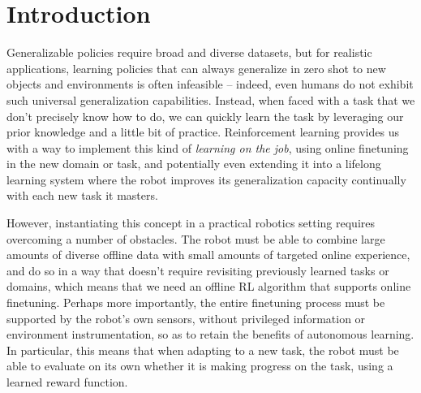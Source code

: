 \documentclass[letterpaper, 10 pt, conference, final]{ieeeconf}   %
\begin{document}


\section{Introduction}

Generalizable policies require broad and diverse datasets, but for realistic applications, learning policies that can always generalize in zero shot to new objects and environments is often infeasible -- indeed, even humans do not exhibit such universal generalization capabilities. Instead, when faced with a task that we don't precisely know how to do, we can quickly learn the task by leveraging our prior knowledge and a little bit of practice. Reinforcement learning provides us with a way to implement this kind of \textit{learning on the job}, using online finetuning in the new domain or task, and potentially even extending it into a lifelong learning system where the robot improves its generalization capacity continually with each new task it masters.

However, instantiating this concept in a practical robotics setting requires overcoming a number of obstacles. The robot must be able to combine large amounts of diverse offline data with small amounts of targeted online experience, and do so in a way that doesn't require revisiting previously learned tasks or domains, which means that we need an offline RL algorithm that supports online finetuning. Perhaps more importantly, the entire finetuning process must be supported by the robot's own sensors, without privileged information or environment instrumentation, so as to retain the benefits of autonomous learning. In particular, this means that when adapting to a new task, the robot must be able to evaluate on its own whether it is making progress on the task, using a learned reward function.
\end{document}
